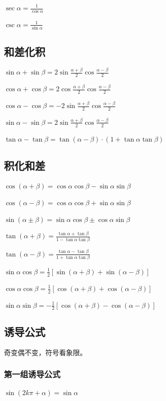 \documentclass[UTF8]{ctexbook}
\begin{document}
{{{  $\sec{\alpha} = \frac{1}{\cos{\alpha}}$

  $\csc{\alpha} = \frac{1}{\sin{\alpha}}$
}%

\subsection{和差化积}{
  $\sin{\alpha}+\sin{\beta} = 2\sin{\frac{\alpha + \beta}{2}}\cos{\frac{\alpha - \beta}{2}}$

  $\cos{\alpha}+\cos{\beta} = 2\cos{\frac{\alpha + \beta}{2}\cos{\frac{\alpha-\beta}{2}}}$

  $\cos{\alpha}-\cos{\beta} = -2\sin{\frac{\alpha + \beta}{2}}\cos{\frac{\alpha - \beta}{2}}$

  $\sin{\alpha}-\sin{\beta} = 2\sin{\frac{\alpha + \beta}{2}}\cos{\frac{\alpha - \beta}{2}}$

  $\tan\alpha - \tan\beta = \tan(\alpha - \beta) \cdot (1 + \tan\alpha\tan\beta)$
}%

\subsection{积化和差}{
  $\cos(\alpha + \beta) = \cos{\alpha}\cos{\beta} - \sin{\alpha}\sin{\beta}$

  $\cos(\alpha - \beta) = \cos{\alpha}\cos{\beta} + \sin{\alpha}\sin{\beta}$

  $\sin(\alpha \pm \beta) = \sin{\alpha}\cos{\beta} \pm \cos{\alpha}\sin{\beta}$

  $\tan(\alpha + \beta) = \frac{\tan\alpha + \tan\beta}{1 - \tan\alpha\tan\beta}$

  $\tan(\alpha - \beta) = \frac{\tan\alpha - \tan\beta}{1 + \tan\alpha\tan\beta}$

  $\sin{\alpha}\cos{\beta} = \frac{1}{2}[\sin{(\alpha + \beta)} + \sin{(\alpha - \beta)}]$

  $\cos{\alpha}\cos{\beta} = \frac{1}{2}[\cos{(\alpha + \beta)} + \cos{(\alpha - \beta)}]$

  $\sin{\alpha}\sin{\beta} = -\frac{1}{2}[\cos{(\alpha + \beta)} - \cos{(\alpha - \beta)}]$
}%

\subsection{诱导公式}{
  \indent 奇变偶不变，符号看象限。
  \subsubsection{第一组诱导公式}{
    $\sin{(2k\pi + \alpha)} = \sin{\alpha}$

}}}}
\end{document}
